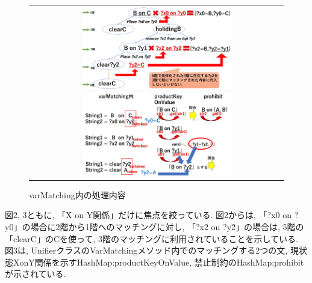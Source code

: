 \documentclass[uplatex,12pt]{jsarticle}
\begin{document}
\begin{figure}[htpb]
  \centering
    \begin{tabular}{c} 
      \begin{minipage}{0.50\hsize}
        \centering
          \includegraphics[width = 6.5cm, pagebox = cropbox, clip]
                          {images/treeSupplement.pdf}
                          \caption{階層的な視点}
                          \label{fig:1.3}
      \end{minipage}
 
      \begin{minipage}{0.50\hsize}
        \centering
          \includegraphics[width = 6.5cm, pagebox = cropbox, clip]
                          {images/varMatching.pdf}
                          \caption{varMatching内の処理内容}
                          \label{fig:1.3}
      \end{minipage} \\ 
    \end{tabular}
\end{figure}     

図2, 3ともに, 「X on Y関係」だけに焦点を絞っている. 図2からは, 「?x0 on ?y0」の場合に2階から1階へのマッチングに対し, 「?x2 on ?y2」の場合は, 5階の「clearC」のCを使って, 3階のマッチングに利用されていることを示している. 図3は, UnifierクラスのVarMatchingメソッド内でのマッチングする2つの文, 現状態XonY関係を示すHashMap:productKeyOnValue, 禁止制約のHashMap:prohibitが示されている. \\
\end{document}
